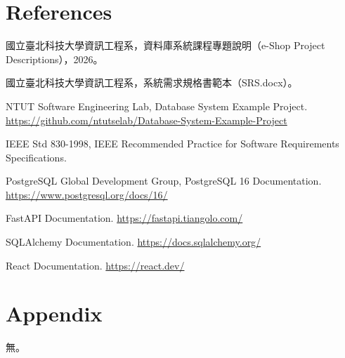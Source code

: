 \documentclass[12pt,a4paper]{article}
\begin{document}
\clearpage
\section*{References}

\begin{enumerate}[label={[\arabic*]},leftmargin=2.5em,itemsep=0.4em]
  \item 國立臺北科技大學資訊工程系，資料庫系統課程專題說明（e-Shop Project Descriptions），2026。
  \item 國立臺北科技大學資訊工程系，系統需求規格書範本（SRS.docx）。
  \item NTUT Software Engineering Lab, Database System Example Project. \url{https://github.com/ntutselab/Database-System-Example-Project}
  \item IEEE Std 830-1998, IEEE Recommended Practice for Software Requirements Specifications.
  \item PostgreSQL Global Development Group, PostgreSQL 16 Documentation. \url{https://www.postgresql.org/docs/16/}
  \item FastAPI Documentation. \url{https://fastapi.tiangolo.com/}
  \item SQLAlchemy Documentation. \url{https://docs.sqlalchemy.org/}
  \item React Documentation. \url{https://react.dev/}
\end{enumerate}

\clearpage
\section*{Appendix}

無。
\end{document}
